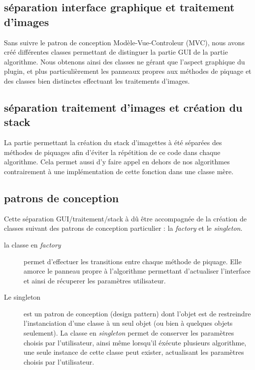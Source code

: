 \subsection*{séparation interface graphique et traitement d'images}
Sans suivre le patron de conception Modèle-Vue-Controleur (MVC), nous avons créé différentes classes permettant de distinguer la partie GUI de la partie algorithme. Nous obtenons ainsi des classes ne gérant que l'aspect graphique du plugin, et plus particulièrement les panneaux propres aux méthodes de piquage et des classes bien distinctes effectuant les traitements d'images.

\subsection*{séparation traitement d'images et création du stack}
La partie permettant la création du stack d'imagettes à été séparées des méthodes de piquages afin d'éviter la répétition de ce code dans chaque algorithme. Cela permet aussi d'y faire appel en dehors de nos algorithmes contrairement à une implémentation de cette fonction dans une classe mère.

\subsection*{patrons de conception}
Cette séparation GUI/traitement/stack à dû être accompagnée de la création de classes suivant des patrons de conception particulier : la \emph{factory} et le \emph{singleton}.
\begin{description}
\item[la classe en \emph{factory}] permet d'effectuer les transitions entre chaque méthode de piquage. Elle amorce le panneau propre à l'algorithme permettant d'actualiser l'interface et ainsi de récuperer les paramètres utilisateur. 
\item [Le singleton] est un patron de conception (design pattern) dont l'objet est de restreindre l'instanciation d'une classe à un seul objet (ou bien à quelques objets seulement). La classe en \emph{singleton} permet de conserver les paramètres choisis par l'utilisateur, ainsi même lorsqu'il éxécute plusieurs algorithme, une seule instance de cette classe peut exister, actualisant les paramètres choisis par l'utilisateur.
\end{description}
%

